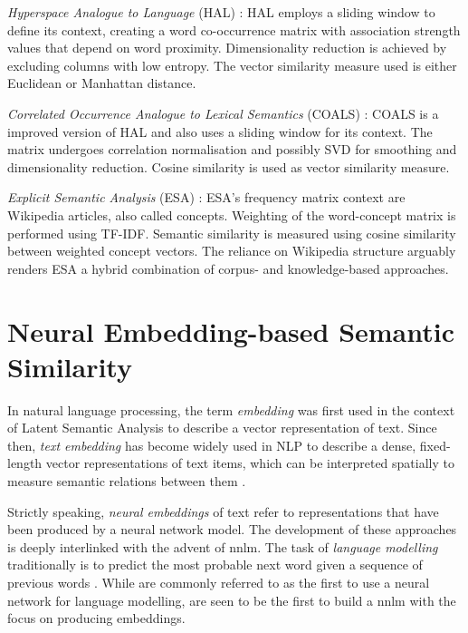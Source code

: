 \documentclass[11pt]{scrreprt}
\let\citef\cite  %
\let\cite\parencite  %
\begin{document}
\textit{Hyperspace Analogue to Language} (HAL) \cite{lundProducingHighdimensionalSemantic1996}: HAL employs a sliding window to define its context, creating a word co-occurrence matrix with association strength values that depend on word proximity. Dimensionality reduction is achieved by excluding columns with low entropy. The vector similarity measure used is either Euclidean or Manhattan distance.

\textit{Correlated Occurrence Analogue to Lexical Semantics} (COALS) \cite{rohde2006improved}: COALS is a improved version of HAL and also uses a sliding window for its context. The matrix undergoes correlation normalisation and possibly SVD for smoothing and dimensionality reduction. Cosine similarity is used as vector similarity measure.

\textit{Explicit Semantic Analysis} (ESA) \cite{gabrilovich2007computing}: ESA's frequency matrix context are Wikipedia articles, also called concepts. Weighting of the word-concept matrix is performed using TF-IDF. Semantic similarity is measured using cosine similarity between weighted concept vectors. The reliance on Wikipedia structure arguably renders ESA a hybrid combination of corpus- and knowledge-based approaches.


\section{Neural Embedding-based Semantic Similarity}
\label{sec:neural-embedding-semantic-similarity}

In natural language processing, the term \textit{embedding} was first used in the context of Latent Semantic Analysis \cite{deerwesterIndexingLatentSemantic1990} to describe a vector representation of text. Since then, \textit{text embedding} has become widely used in NLP to describe a dense, fixed-length vector representations of text items, which can be interpreted spatially to measure semantic relations between them \cite{almeidaWordEmbeddingsSurvey2023}.

Strictly speaking, \textit{neural embeddings} of text refer to representations that have been produced by a neural network model. The development of these approaches is deeply interlinked with the advent of \gls{nnlm}. The task of \textit{language modelling} traditionally is to predict the most probable next word given a sequence of previous words \cite{chenEmpiricalStudySmoothing1999}. While \citef{bengioNeuralProbabilisticLanguage2000} are commonly referred to as the first to use a neural network for language modelling, \citef{collobertUnifiedArchitectureNatural2008} are seen to be the first to build a \gls{nnlm} with the focus on producing embeddings. 
\end{document}
